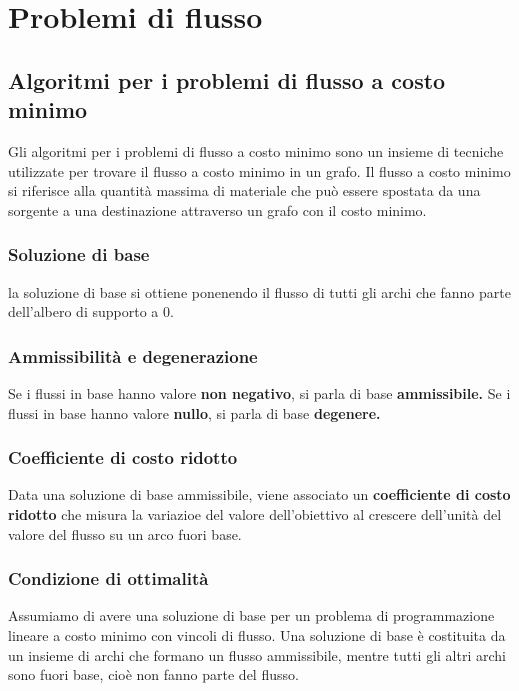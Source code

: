 \chapter{Problemi di flusso}

\section{Algoritmi per i problemi di flusso a costo minimo}

Gli algoritmi per i problemi di flusso a costo minimo sono un insieme di tecniche utilizzate per trovare il flusso a costo minimo in un grafo. Il flusso a costo minimo si riferisce alla quantità massima di materiale che può essere spostata da una sorgente a una destinazione attraverso un grafo con il costo minimo.


\subsection{Soluzione di base}
la soluzione di base si ottiene ponenendo il flusso di tutti gli archi che fanno parte
dell'albero di supporto a 0.

\subsection{Ammissibilità e degenerazione}
Se i flussi in base hanno valore \textbf{non negativo}, si parla di base \textbf{ammissibile.}
Se i flussi in base hanno valore \textbf{nullo}, si parla di base \textbf{degenere.}

\subsection{Coefficiente di costo ridotto}
Data una soluzione di base ammissibile, viene associato un \textbf{coefficiente di costo ridotto} che misura
la variazioe del valore dell'obiettivo al crescere dell'unità del valore del flusso su un arco 
fuori base.

\subsection{Condizione di ottimalità}
Assumiamo di avere una soluzione di base per un problema di programmazione lineare a costo minimo con vincoli di flusso. Una soluzione di base è costituita da un insieme di archi che formano un flusso ammissibile, mentre tutti gli altri archi sono fuori base, cioè non fanno parte del flusso.

